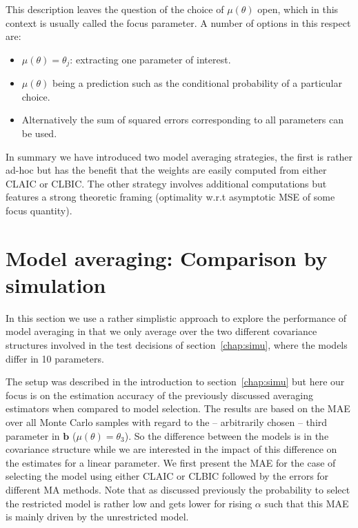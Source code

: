\documentclass[12pt, a4paper]{article}
\numberwithin{defcounter}{section}
\numberwithin{excounter}{section}
\begin{document}
This description leaves the question of the choice of $\mu(\theta)$ open, which in this context is usually called the focus parameter. A number of options in this respect are:
\begin{itemize}
	\item $\mu(\theta) = \theta_j$: extracting one parameter of interest.
    \item $\mu(\theta)$ being a prediction such as the conditional probability of a particular choice.
    \item Alternatively the sum of squared errors corresponding to all parameters can be used. 
\end{itemize}


In summary we have introduced two model averaging strategies, the first is rather ad-hoc but has the benefit that the weights are easily computed from either \ac{CLAIC} or \ac{CLBIC}. The other strategy involves additional computations but features a strong theoretic framing (optimality w.r.t asymptotic \ac{MSE} of some focus quantity).


\section{Model averaging: Comparison by simulation}

In this section we use a rather simplistic approach to explore the performance of model averaging in that we only average over the two different covariance structures involved in the test decisions of section~\ref{chap:simu}, where the models differ in 10 parameters.  

The setup was described in the introduction to section~\ref{chap:simu} but here our focus is on the estimation accuracy of the previously discussed averaging estimators when compared to model selection. The results are based on the \ac{MAE} over all Monte Carlo samples with regard to the -- arbitrarily chosen -- third parameter in $\textbf{b}$ ($\mu(\theta) = \theta_3$). So the difference between the models is in the covariance structure while we are interested in the impact of this difference on the estimates for a linear parameter. We first present the \ac{MAE} for the case of selecting the model using either \ac{CLAIC} or \ac{CLBIC} followed by the errors for different \ac{MA} methods. Note that as discussed previously the probability to select the restricted model is rather low and gets lower for rising $\alpha$ such that this \ac{MAE} is mainly driven by the unrestricted model. 
\end{document}
